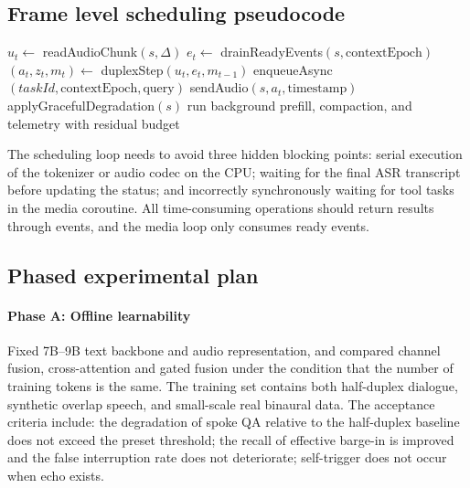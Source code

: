 \documentclass[UTF8,fontset=none,a4paper,10pt]{ctexart}
\begin{document}
\subsection{Frame level scheduling pseudocode}

\begin{algorithm}[H]
\caption{Deadline-aware duplex session loop}
\begin{algorithmic}[1]
  \State $u_t\gets$ readAudioChunk$(s,\Delta)$
  \State $e_t\gets$ drainReadyEvents$(s,\mathrm{contextEpoch})$
  \State $(a_t,z_t,m_t)\gets$ duplexStep$(u_t,e_t,m_{t-1})$
    \State enqueueAsync$(taskId,\mathrm{contextEpoch},\mathrm{query})$
  \EndIf
    \State sendAudio$(s,a_t,\mathrm{timestamp})$
  \Else
    \State applyGracefulDegradation$(s)$
  \EndIf
\EndFor
\State run background prefill, compaction, and telemetry with residual budget
\end{algorithmic}
\end{algorithm}

The scheduling loop needs to avoid three hidden blocking points: serial execution of the tokenizer or audio codec on the CPU; waiting for the final ASR transcript before updating the status; and incorrectly synchronously waiting for tool tasks in the media coroutine. All time-consuming operations should return results through events, and the media loop only consumes ready events.

\subsection{Phased experimental plan}

\paragraph{Phase A: Offline learnability}
Fixed 7B--9B text backbone and audio representation, and compared channel fusion, cross-attention and gated fusion under the condition that the number of training tokens is the same. The training set contains both half-duplex dialogue, synthetic overlap speech, and small-scale real binaural data. The acceptance criteria include: the degradation of spoke QA relative to the half-duplex baseline does not exceed the preset threshold; the recall of effective barge-in is improved and the false interruption rate does not deteriorate; self-trigger does not occur when echo exists.
\end{document}
